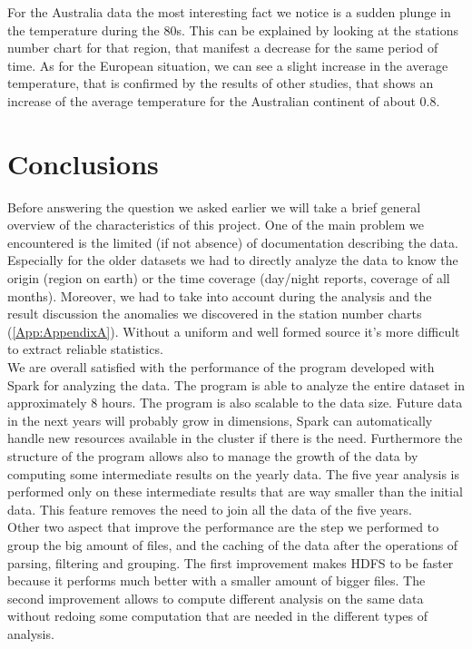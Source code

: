 \documentclass{vldb}
\begin{document}
For the Australia data the most interesting fact we notice is a sudden plunge in the temperature during the 80s. This can be explained by looking at the stations number chart for that region, that manifest a decrease for the same period of time. As for the European situation, we can see a slight increase in the average temperature, that is confirmed by the results of other studies, that shows an increase of the average temperature for the Australian continent of about 0.8\degree. 

\section{Conclusions}
\label{sec:con}
Before answering the question we asked earlier we will take a brief general overview of the characteristics of this project. One of the main problem we encountered is the limited (if not absence) of documentation describing the data. Especially for the older datasets we had to directly analyze the data to know the origin (region on earth) or the time coverage (day/night reports, coverage of all months). Moreover, we had to take into account during the analysis and the result discussion the anomalies we discovered in the station number charts (\ref{App:AppendixA}). Without a uniform and well formed source it's more difficult to extract reliable statistics.\\
We are overall satisfied with the performance of the program developed with Spark for analyzing the data. The program is able to analyze the entire dataset in approximately 8 hours. The program is also scalable to the data size. Future data in the next years will probably grow in dimensions, Spark can automatically handle new resources available in the cluster if there is the need. Furthermore the structure of the program allows also to manage the growth of the data by computing some intermediate results on the yearly data. The five year analysis is performed only on these intermediate results that are way smaller than the initial data. This feature removes the need to join all the data of the five years.\\
Other two aspect that improve the performance are the step we performed to group the big amount of files, and the caching of the data after the operations of parsing, filtering and grouping. The first improvement makes HDFS to be faster because it performs much better with a smaller amount of bigger files. The second improvement allows to compute different analysis on the same data without redoing some computation that are needed in the different types of analysis.\\
\end{document}
